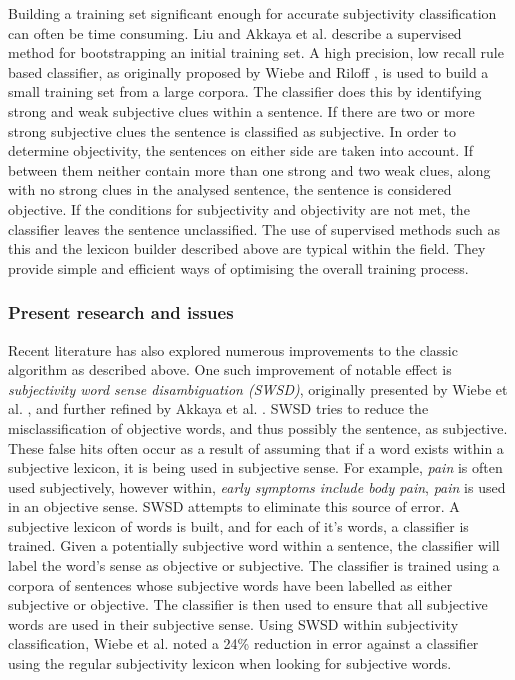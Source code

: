 Building a training set significant enough for accurate subjectivity classification can often be time consuming. Liu \cite{Liu:2010tm} and Akkaya et al. \cite{Akkaya:2009ww} describe a supervised method for bootstrapping an initial training set. A high precision, low recall rule based classifier, as originally proposed by Wiebe and Riloff \cite{Wiebe:2003wa}, is used to build a small training set from a large corpora. The classifier does this by identifying strong and weak subjective clues within a sentence. If there are two or more strong subjective clues the sentence is classified as subjective. In order to determine objectivity, the sentences on either side are taken into account. If between them neither contain more than one strong and two weak clues, along with no strong clues in the analysed sentence, the sentence is considered objective. If the conditions for subjectivity and objectivity are not met, the classifier leaves the sentence unclassified. The use of supervised methods such as this and the lexicon builder described above are typical within the field. They provide simple and efficient ways of optimising the overall training process.

\subsubsection{Present research and issues}

Recent literature has also explored numerous improvements to the classic algorithm as described above. One such improvement of notable effect is \emph{subjectivity word sense disambiguation (SWSD)}, originally presented by Wiebe et al. \cite{Wiebe:2006te}, and further refined by Akkaya et al. \cite{Akkaya:2009ww}. SWSD tries to reduce the misclassification of objective words, and thus possibly the sentence, as subjective. These false hits often occur as a result of assuming that if a word exists within a subjective lexicon, it is being used in subjective sense. For example, \emph{pain} is often used subjectively, however within, \emph{early symptoms include body pain}, \emph{pain} is used in an objective sense. SWSD attempts to eliminate this source of error. A subjective lexicon of words is built, and for each of it's words, a classifier is trained. Given a potentially subjective word within a sentence, the classifier will label the word's sense as objective or subjective. The classifier is trained using a corpora of sentences whose subjective words have been labelled as either subjective or objective. The classifier is then used to ensure that all subjective words are used in their subjective sense. Using SWSD within subjectivity classification, Wiebe et al. \cite{Akkaya:2009ww} noted a 24\% reduction in error against a classifier using the regular subjectivity lexicon when looking for subjective words. 

